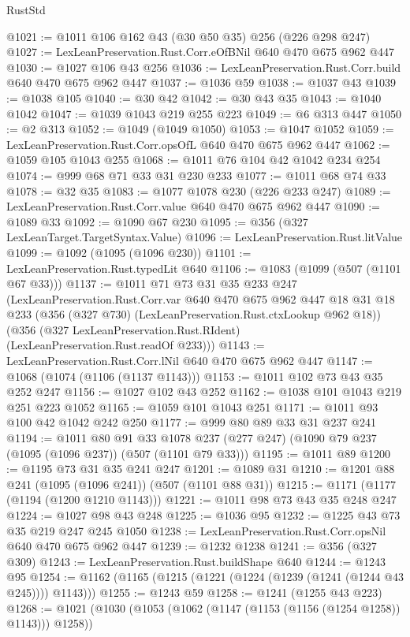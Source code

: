 \begin{lexlean}{RustStd}
\begin{coremodule}
@1021 := @1011 @106 @162 @43 (@30 @50 @35) @256 (@226 @298 @247)
@1027 := LexLeanPreservation.Rust.Corr.eOfBNil @640 @470 @675 @962 @447
@1030 := @1027 @106 @43 @256
@1036 := LexLeanPreservation.Rust.Corr.build @640 @470 @675 @962 @447
@1037 := @1036 @59
@1038 := @1037 @43
@1039 := @1038 @105
@1040 := @30 @42
@1042 := @30 @43 @35
@1043 := @1040 @1042
@1047 := @1039 @1043 @219 @255 @223
@1049 := @6 @313 @447
@1050 := @2 @313
@1052 := @1049 (@1049 @1050)
@1053 := @1047 @1052
@1059 := LexLeanPreservation.Rust.Corr.opsOfL @640 @470 @675 @962 @447
@1062 := @1059 @105 @1043 @255
@1068 := @1011 @76 @104 @42 @1042 @234 @254
@1074 := @999 @68 @71 @33 @31 @230 @233
@1077 := @1011 @68 @74 @33
@1078 := @32 @35
@1083 := @1077 @1078 @230 (@226 @233 @247)
@1089 := LexLeanPreservation.Rust.Corr.value @640 @470 @675 @962 @447
@1090 := @1089 @33
@1092 := @1090 @67 @230
@1095 := @356 (@327 LexLeanTarget.TargetSyntax.Value)
@1096 := LexLeanPreservation.Rust.litValue
@1099 := @1092 (@1095 (@1096 @230))
@1101 := LexLeanPreservation.Rust.typedLit @640
@1106 := @1083 (@1099 (@507 (@1101 @67 @33)))
@1137 := @1011
    @71
    @73
    @31
    @35
    @233
    @247
    (LexLeanPreservation.Rust.Corr.var
      @640
      @470
      @675
      @962
      @447
      @18
      @31
      @18
      @233
      (@356 (@327 @730) (LexLeanPreservation.Rust.ctxLookup @962 @18))
      (@356 (@327 LexLeanPreservation.Rust.RIdent) (LexLeanPreservation.Rust.readOf @233)))
@1143 := LexLeanPreservation.Rust.Corr.lNil @640 @470 @675 @962 @447
@1147 := @1068 (@1074 (@1106 (@1137 @1143)))
@1153 := @1011 @102 @73 @43 @35 @252 @247
@1156 := @1027 @102 @43 @252
@1162 := @1038 @101 @1043 @219 @251 @223 @1052
@1165 := @1059 @101 @1043 @251
@1171 := @1011 @93 @100 @42 @1042 @242 @250
@1177 := @999 @80 @89 @33 @31 @237 @241
@1194 := @1011
    @80
    @91
    @33
    @1078
    @237
    (@277 @247)
    (@1090 @79 @237 (@1095 (@1096 @237)) (@507 (@1101 @79 @33)))
@1195 := @1011 @89
@1200 := @1195 @73 @31 @35 @241 @247
@1201 := @1089 @31
@1210 := @1201 @88 @241 (@1095 (@1096 @241)) (@507 (@1101 @88 @31))
@1215 := @1171 (@1177 (@1194 (@1200 @1210 @1143)))
@1221 := @1011 @98 @73 @43 @35 @248 @247
@1224 := @1027 @98 @43 @248
@1225 := @1036 @95
@1232 := @1225 @43 @73 @35 @219 @247 @245 @1050
@1238 := LexLeanPreservation.Rust.Corr.opsNil @640 @470 @675 @962 @447
@1239 := @1232 @1238
@1241 := @356 (@327 @309)
@1243 := LexLeanPreservation.Rust.buildShape @640
@1244 := @1243 @95
@1254 := @1162 (@1165 (@1215 (@1221 (@1224 (@1239 (@1241 (@1244 @43 @245)))) @1143)))
@1255 := @1243 @59
@1258 := @1241 (@1255 @43 @223)
@1268 := @1021 (@1030 (@1053 (@1062 (@1147 (@1153 (@1156 (@1254 @1258)) @1143))) @1258))

\end{coremodule}
\end{lexlean}
